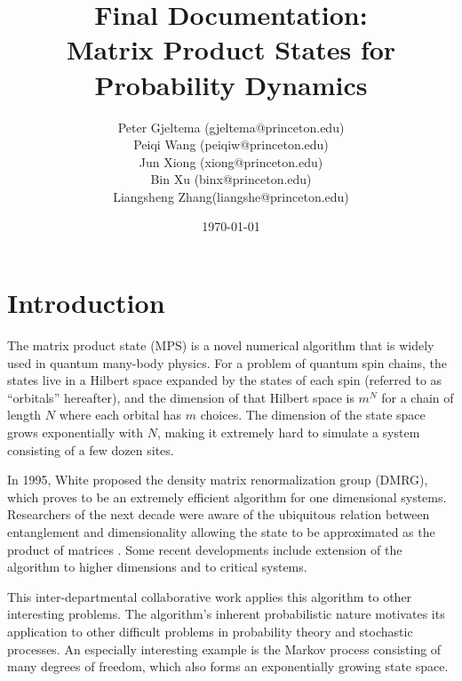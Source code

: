 \documentclass[english]{article}
\begin{document}
\title{Final Documentation: \\Matrix Product States for Probability Dynamics}


\author{Peter Gjeltema (gjeltema@princeton.edu)
	   \\ Peiqi Wang (peiqiw@princeton.edu)
	    \\ Jun Xiong (xiong@princeton.edu) 
	    \\ Bin Xu (binx@princeton.edu) 
	    \\ Liangsheng Zhang(liangshe@princeton.edu)}
	    
\date{\today}

\maketitle

\section{Introduction}

The matrix product state (MPS) is a novel numerical algorithm that is
widely used in quantum many-body physics. For a problem of quantum
spin chains, the states live in a Hilbert space expanded by the states
of each spin (referred to as ``orbitals'' hereafter), and the dimension
of that Hilbert space is $m^{N}$ for a chain of length $N$ where each orbital has $m$ choices. 
The dimension of the state space
grows exponentially with $N$, making it extremely hard to simulate
a system consisting of a few dozen sites. 

In 1995, White \cite{white} proposed
the density matrix renormalization group (DMRG), which proves to be an extremely efficient algorithm for one dimensional systems. Researchers of the next decade were aware of the ubiquitous relation between entanglement and dimensionality allowing the state to be approximated as the product of matrices \cite{schollwock}. Some recent developments include extension of the algorithm to higher dimensions\cite{cirac} and to critical systems\cite{vidal}.

This inter-departmental collaborative work applies this algorithm to other interesting problems. The algorithm's inherent probabilistic nature motivates its application to other difficult problems in probability theory and stochastic processes. An especially interesting example is the Markov process consisting of many degrees of freedom, which also forms an exponentially growing state space. 
\end{document}
